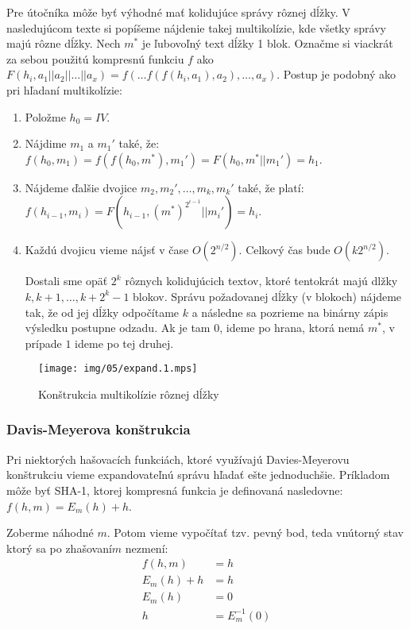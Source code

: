 Pre útočníka môže byť výhodné mať kolidujúce správy rôznej dĺžky. 
V nasledujúcom texte si popíšeme nájdenie takej multikolízie,
kde všetky správy majú rôzne dĺžky. Nech $m^*$ je ľubovoľný
text dĺžky 1 blok.
Označme si viackrát za sebou použitú kompresnú funkciu $f$ ako
    $F(h_i, a_1||a_2||\dots||a_x) = 
    f(\dots f(f(h_i, a_1), a_2), \dots, a_x)$.
Postup je podobný ako pri hľadaní multikolízie:
\begin{enumerate}
    \itemsep -1.2mm

    \item Položme $h_0 = IV$.

    \item Nájdime $m_1$ a $m_1'$ také, že: 
        $f(h_0, m_1) = f(f(h_0, m^*), m_1') = F(h_0, m^*||m_1') = h_1$. 

    \item Nájdeme ďalšie dvojice $m_2, m_2', \dots, m_k, m_k'$ také, že platí:
        $f(h_{i-1}, m_i) = F(h_{i-1}, (m^*)^{2^{i-1}}||m_i') = h_i$.

    \item Každú dvojicu vieme nájsť v čase $O(2^{n/2})$.
        Celkový čas bude $O(k 2^{n/2})$.
        
        Dostali sme opäť $2^k$ rôznych kolidujúcich textov, ktoré tentokrát 
        majú dlžky $k, k+1, \dots, k+2^k-1$ blokov. 
        Správu požadovanej dĺžky (v blokoch) nájdeme tak, 
        že od jej dĺžky odpočítame $k$ a následne
        sa pozrieme na binárny zápis výsledku postupne odzadu.
        Ak je tam $0$, ideme po hrana, ktorá nemá $m^*$,
        v prípade $1$ ideme po tej druhej.
\end{enumerate}

\begin{figure}[h!]
    \centering
    \texttt{[image: img/05/expand.1.mps]}
    \caption{Konštrukcia multikolízie rôznej dĺžky}
    \label{fig:expand1}
\end{figure}

\subsubsection{Davis-Meyerova konštrukcia}

Pri niektorých hašovacích funkciách, ktoré využívajú
Davies-Meyerovu konštrukciu vieme expandovateľnú správu hľadať
ešte jednoduchšie. Príkladom môže byť SHA-1, ktorej kompresná funkcia
je definovaná nasledovne:
$f(h, m) = E_m(h)+h$.

Zoberme náhodné $m$. Potom vieme vypočítať tzv. pevný bod, teda vnútorný
stav ktorý sa po \clqq zhašovaní\crqq $m$ nezmení:
\begin{align*}
    f(h,m) &= h \\
    E_m(h) + h&= h \\
    E_m(h) &= 0 \\
    h &= E_m^{-1}(0)
\end{align*}

